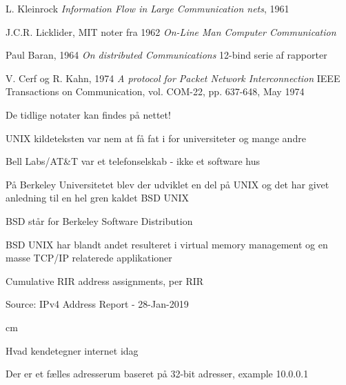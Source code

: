 \documentclass[Screen16to9,17pt]{foils}
\begin{document}

\begin{list1}
\item L. Kleinrock \emph{Information Flow in Large Communication nets}, 1961
\item J.C.R. Licklider, MIT noter fra 1962 \emph{On-Line Man Computer
  Communication}
\item Paul Baran, 1964 \emph{On distributed Communications}
12-bind serie af rapporter\\
\item V. Cerf og R. Kahn, 1974
\emph{A protocol for Packet Network Interconnection}
IEEE Transactions on Communication, vol. COM-22, pp. 637-648, May 1974
\item De tidlige notater kan findes på nettet!
\end{list1}



\begin{list1}
  \item UNIX kildeteksten var nem at få fat i for universiteter og
  mange andre
\item Bell Labs/AT\&T var et telefonselskab - ikke et software hus
\item På Berkeley Universitetet blev der udviklet en del på UNIX og
  det har givet anledning til en hel gren kaldet BSD UNIX
\item BSD står for Berkeley Software Distribution
\item BSD UNIX har blandt andet resulteret i virtual memory management
  og en masse TCP/IP relaterede applikationer
\end{list1}


\centerline{Cumulative RIR address assignments, per RIR}

\begin{list1}
\item Source:
IPv4 Address Report - 28-Jan-2019
\end{list1}


 cm

\begin{list1}
\item Hvad kendetegner internet idag
\item Der er et fælles adresserum baseret på 32-bit adresser, example 10.0.0.1
\end{list1}
\end{document}
